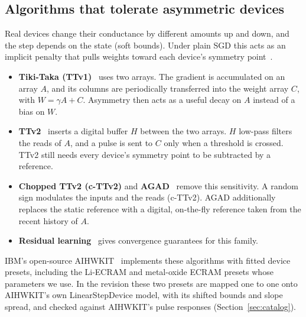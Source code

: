 \subsection{Algorithms that tolerate asymmetric devices}
Real devices change their conductance by different amounts up and down, and the step depends on the state (soft bounds). Under
plain SGD this acts as an implicit penalty that pulls weights toward each device's symmetry point~\cite{gokmen2020,wu2025}.
\begin{itemize}
\item \textbf{Tiki-Taka (TTv1)}~\cite{gokmen2020} uses two arrays. The gradient is accumulated on an array $A$, and its columns
      are periodically transferred into the weight array $C$, with $W=\gamma A+C$. Asymmetry then acts as a useful decay on $A$
      instead of a bias on $W$.
\item \textbf{TTv2}~\cite{gokmen2021} inserts a digital buffer $H$ between the two arrays. $H$ low-pass filters the reads of $A$,
      and a pulse is sent to $C$ only when a threshold is crossed. TTv2 still needs every device's symmetry point to be
      subtracted by a reference.
\item \textbf{Chopped TTv2 (c-TTv2)} and \textbf{AGAD}~\cite{rasch2024,rasch2023arxiv} remove this sensitivity. A random sign
      modulates the inputs and the reads (c-TTv2). AGAD additionally replaces the static reference with a digital, on-the-fly
      reference taken from the recent history of $A$.
\item \textbf{Residual learning}~\cite{wu2025} gives convergence guarantees for this family.
\end{itemize}
IBM's open-source AIHWKIT~\cite{rasch2021aihwkit} implements these algorithms with fitted device presets, including the
Li-ECRAM and metal-oxide ECRAM presets whose parameters we use. In the revision these two presets are mapped one to one onto
AIHWKIT's own LinearStepDevice model, with its shifted bounds and slope spread, and checked against AIHWKIT's pulse responses
(Section~\ref{sec:catalog}).


